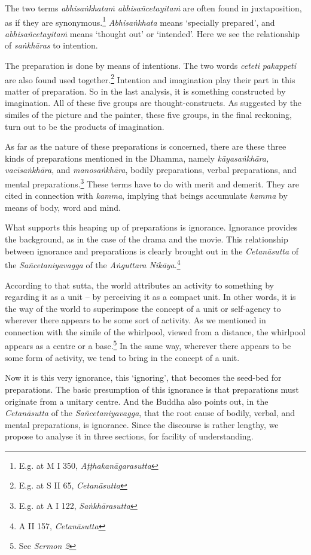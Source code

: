 The two terms \emph{abhisaṅkhataṁ abhisañcetayitaṁ} are often found in juxtaposition, as if they are synonymous.\footnote{E.g. at M I 350, \emph{Aṭṭhakanāgarasutta}} \emph{Abhisaṅkhata} means `specially prepared', and \emph{abhisañcetayitaṁ} means `thought out' or `intended'. Here we see the relationship of \emph{saṅkhāras} to intention.

The preparation is done by means of intentions. The two words \emph{ceteti} \emph{pakappeti} are also found used together.\footnote{E.g. at S II 65, \emph{Cetanāsutta}} Intention and imagination play their part in this matter of preparation. So in the last analysis, it is something constructed by imagination. All of these five groups are thought-constructs. As suggested by the similes of the picture and the painter, these five groups, in the final reckoning, turn out to be the products of imagination.

As far as the nature of these preparations is concerned, there are these three kinds of preparations mentioned in the Dhamma, namely \emph{kāyasaṅkhāra, vacīsaṅkhāra}, and \emph{manosaṅkhāra}, bodily preparations, verbal preparations, and mental preparations.\footnote{E.g. at A I 122, \emph{Saṅkhārasutta}} These terms have to do with merit and demerit. They are cited in connection with \emph{kamma}, implying that beings accumulate \emph{kamma} by means of body, word and mind.

What supports this heaping up of preparations is ignorance. Ignorance provides the background, as in the case of the drama and the movie. This relationship between ignorance and preparations is clearly brought out in the \emph{Cetanāsutta} of the \emph{Sañcetaniyavagga} of the \emph{Aṅguttara Nikāya}.\footnote{A II 157, \emph{Cetanāsutta}}

According to that sutta, the world attributes an activity to something by regarding it as a unit -- by perceiving it as a compact unit. In other words, it is the way of the world to superimpose the concept of a unit or self-agency to wherever there appears to be some sort of activity. As we mentioned in connection with the simile of the whirlpool, viewed from a distance, the whirlpool appears as a centre or a base.\footnote{See \emph{Sermon 2}} In the same way, wherever there appears to be some form of activity, we tend to bring in the concept of a unit.

Now it is this very ignorance, this `ignoring', that becomes the seed-bed for preparations. The basic presumption of this ignorance is that preparations must originate from a unitary centre. And the Buddha also points out, in the \emph{Cetanāsutta} of the \emph{Sañcetaniyavagga}, that the root cause of bodily, verbal, and mental preparations, is ignorance. Since the discourse is rather lengthy, we propose to analyse it in three sections, for facility of understanding.

